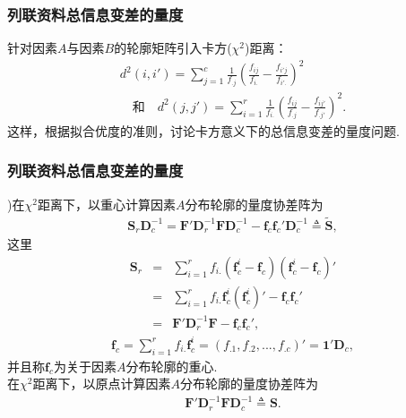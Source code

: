\begin{frame}\frametitle{\color{blue}列联资料总信息变差的量度}

\quad\quad {\color{magenta} {\hei 2. 总信息变差的量度}}
 \vskip0.3cm

\quad\quad
 针对因素$A$与因素$B$的轮廓矩阵引入卡方($\chi^{2}$)距离：
    \begin{eqnarray}
    d^{2}(i,i')=\sum^{c}_{j=1}\frac{1}{f_{.j}}(\frac{f_{ij}}{f_{i.}}-\frac{f_{i'j}}{f_{i'.}})^{2}\nonumber
\\\quad\text{和}\quad
    d^{2}(j,j')=\sum^{r}_{i=1}\frac{1}{f_{i.}}(\frac{f_{ij}}{f_{.j}}-\frac{f_{ij'}}{f_{.j'}})^{2}.
    \end{eqnarray}
\quad \quad 这样，根据拟合优度的准则，讨论卡方意义下的总信息变差的量度问题.\\

\end{frame}
\begin{frame}\frametitle{\color{blue}列联资料总信息变差的量度}

\begin{footnotesize}
\quad{})\quad 在$\chi^{2}$距离下，以重心计算因素$A$分布轮廓的量度协差阵为
\begin{eqnarray}
 \mathbf{S}_{r}\mathbf{D}_{c}^{-1}=\mathbf{F}'\mathbf{D}_{r}^{-1}\mathbf{F}\mathbf{D}_{c}^{-1}
         -\mathbf{f}_{c}\mathbf{f}_{c}'\mathbf{D}_{c}^{-1}\triangleq\mathbf{\widetilde{S}},
\end{eqnarray}
这里
\begin{eqnarray}
        \mathbf{S}_{r}&=&\sum^{r}_{i=1}f_{i.}(\mathbf{f}^{i}_{c}-\mathbf{f}_{c})
                          (\mathbf{f}^{i}_{c}-\mathbf{f}_{c})' \nonumber\\
                      &=&\sum^{r}_{i=1}f_{i.}\mathbf{f}^{i}_{c}(\mathbf{f}^{i}_{c})'
                           -\mathbf{f}_{c}\mathbf{f}_{c}' \nonumber\\
                      &=&\mathbf{F}'\mathbf{D}_{r}^{-1}\mathbf{F}-
                          \mathbf{f}_{c}\mathbf{f}_{c}',
\end{eqnarray}
\begin{eqnarray}
\mathbf{f}_{c}=\sum^{r}_{i=1}f_{i.}\mathbf{f}_{c}^{i}=(f_{.1},f_{.2},...,f_{.c})'=\mathbf{1}'\mathbf{D}_{c},
\end{eqnarray}
并且称$\mathbf{f}_{c}$为关于因素$A$分布轮廓的重心.\\
\color{magenta} 在$\chi^{2}$距离下，以原点计算因素$A$分布轮廓的量度协差阵为
\begin{eqnarray}
 \mathbf{F}'\mathbf{D}_{r}^{-1}\mathbf{F}\mathbf{D}_{c}^{-1}\triangleq\mathbf{S}.
\end{eqnarray}
\end{footnotesize}
\end{frame}

